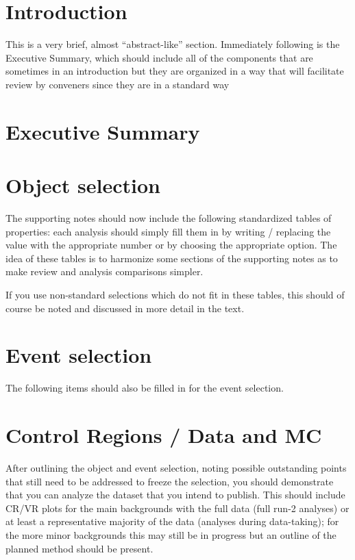 \documentclass[NOTE, atlasdraft=true, texlive=2016, USenglish]{\ATLASLATEXPATH atlasdoc}
\author{ATLAS EXOT Group}
\begin{document}
\maketitle

\tableofcontents

\section{Introduction}

This is a very brief, almost ``abstract-like'' section.  Immediately following is the 
Executive Summary, which should include all of the components that are sometimes in an 
introduction but they are organized in a way that will facilitate review by conveners
since they are in a standard way


\section{Executive Summary}


\section{Object selection}
The supporting notes should now include the following standardized tables of properties: each analysis should simply fill them
in by writing / replacing the value with the appropriate number or by choosing the appropriate option.
The idea of these tables is to harmonize some sections of the supporting notes as to make review and analysis comparisons simpler.

If you use non-standard selections which do not fit in these tables, this should of course be noted and discussed in more detail in the text.
 









\section{Event selection}
The following items should also be filled in for the event selection.



\section{Control Regions / Data and MC}
After outlining the object and event selection, noting possible outstanding points that still
need to be addressed to freeze the selection, you should demonstrate that you can analyze
the dataset that you intend to publish.  This should include CR/VR plots for
the main backgrounds with the full data (full run-2 analyses) or at least a representative
majority of the data (analyses during data-taking); for the more minor backgrounds this may
still be in progress but an outline of the planned method should be present.
\end{document}
